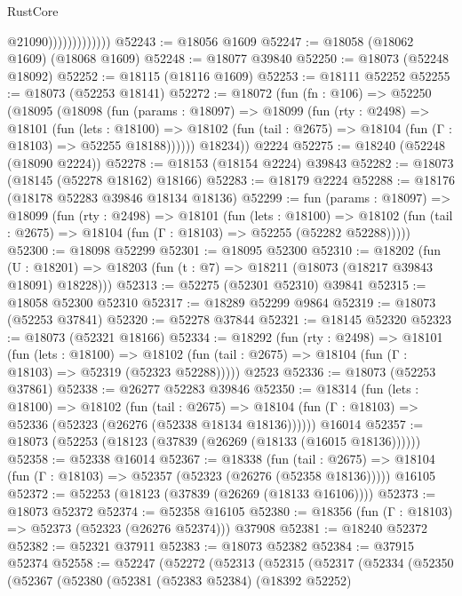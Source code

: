 \begin{lexlean}{RustCore}
\begin{coremodule}
                              @21090)))))))))))))
@52243 := @18056 @1609
@52247 := @18058 (@18062 @1609) (@18068 @1609)
@52248 := @18077 @39840
@52250 := @18073 (@52248 @18092)
@52252 := @18115 (@18116 @1609)
@52253 := @18111 @52252
@52255 := @18073 (@52253 @18141)
@52272 := @18072
    (fun (fn : @106) =>
    @52250
      (@18095
        (@18098
          (fun (params : @18097) =>
          @18099
            (fun (rty : @2498) =>
            @18101
              (fun (lets : @18100) =>
              @18102 (fun (tail : @2675) => @18104 (fun (Γ : @18103) => @52255 @18188))))))
        @18234))
    @2224
@52275 := @18240 (@52248 (@18090 @2224))
@52278 := @18153 (@18154 @2224) @39843
@52282 := @18073 (@18145 (@52278 @18162) @18166)
@52283 := @18179 @2224
@52288 := @18176 (@18178 @52283 @39846 @18134 @18136)
@52299 := fun (params : @18097) =>
  @18099
    (fun (rty : @2498) =>
    @18101
      (fun (lets : @18100) =>
      @18102 (fun (tail : @2675) => @18104 (fun (Γ : @18103) => @52255 (@52282 @52288)))))
@52300 := @18098 @52299
@52301 := @18095 @52300
@52310 := @18202
    (fun (U : @18201) => @18203 (fun (t : @7) => @18211 (@18073 (@18217 @39843 @18091) @18228)))
@52313 := @52275 (@52301 @52310) @39841
@52315 := @18058 @52300 @52310
@52317 := @18289 @52299 @9864
@52319 := @18073 (@52253 @37841)
@52320 := @52278 @37844
@52321 := @18145 @52320
@52323 := @18073 (@52321 @18166)
@52334 := @18292
    (fun (rty : @2498) =>
    @18101
      (fun (lets : @18100) =>
      @18102 (fun (tail : @2675) => @18104 (fun (Γ : @18103) => @52319 (@52323 @52288)))))
    @2523
@52336 := @18073 (@52253 @37861)
@52338 := @26277 @52283 @39846
@52350 := @18314
    (fun (lets : @18100) =>
    @18102
      (fun (tail : @2675) =>
      @18104 (fun (Γ : @18103) => @52336 (@52323 (@26276 (@52338 @18134 @18136))))))
    @16014
@52357 := @18073 (@52253 (@18123 (@37839 (@26269 (@18133 (@16015 @18136))))))
@52358 := @52338 @16014
@52367 := @18338
    (fun (tail : @2675) => @18104 (fun (Γ : @18103) => @52357 (@52323 (@26276 (@52358 @18136)))))
    @16105
@52372 := @52253 (@18123 (@37839 (@26269 (@18133 @16106))))
@52373 := @18073 @52372
@52374 := @52358 @16105
@52380 := @18356 (fun (Γ : @18103) => @52373 (@52323 (@26276 @52374))) @37908
@52381 := @18240 @52372
@52382 := @52321 @37911
@52383 := @18073 @52382
@52384 := @37915 @52374
@52558 := @52247
    (@52272
      (@52313
        (@52315
          (@52317
            (@52334
              (@52350
                (@52367
                  (@52380
                    (@52381
                      (@52383 @52384)
                      (@18392 @52252)

\end{coremodule}
\end{lexlean}
